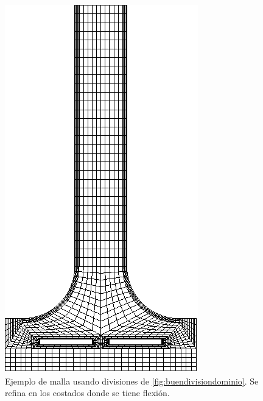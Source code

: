 \begin{figure}[htb!]
	\centering
	\includegraphics[angle=90,width=\linewidth]{fig/mallaPelton.eps}
	\caption{Ejemplo de malla usando divisiones de  \ref{fig:buendivisiondominio}. Se refina en los costados donde se tiene flexión.}
\end{figure}

